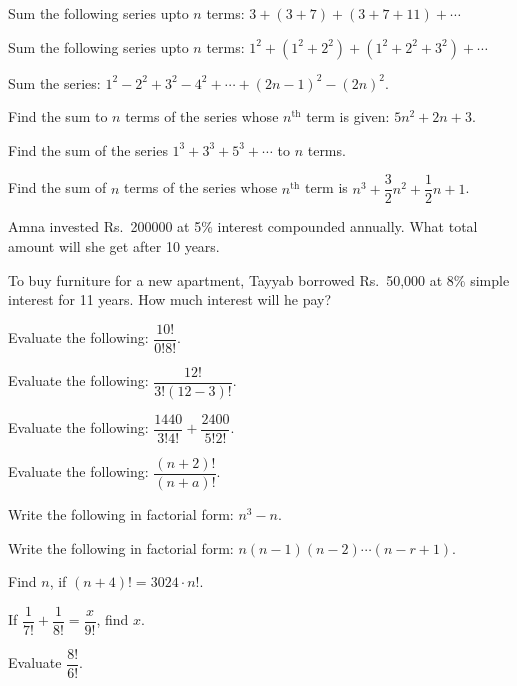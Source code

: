 \documentclass[11pt,a4paper]{article}
\begin{document}
\begin{shortlist}
\item Sum the following series upto $n$ terms: $3+(3+7)+(3+7+11)+\cdots$

\item Sum the following series upto $n$ terms: $1^2+(1^2+2^2)+(1^2+2^2+3^2)+\cdots$

\item Sum the series: $1^2-2^2+3^2-4^2+\cdots+(2n-1)^2-(2n)^2$.

\item Find the sum to $n$ terms of the series whose $n^{\text{th}}$ term is given: $5n^2+2n+3$.

\item Find the sum of the series $1^3+3^3+5^3+\cdots$ to $n$ terms.

\item Find the sum of $n$ terms of the series whose $n^{\text{th}}$ term is $n^3+\dfrac{3}{2}n^2+\dfrac{1}{2}n+1$.

\item Amna invested Rs.\ 200000 at 5\% interest compounded annually. What total amount will she get after 10 years.

\item To buy furniture for a new apartment, Tayyab borrowed Rs.\ 50{,}000 at 8\% simple interest for 11 years. How much interest will he pay?

\item Evaluate the following: $\dfrac{10!}{0!8!}$.

\item Evaluate the following: $\dfrac{12!}{3!(12-3)!}$.

\item Evaluate the following: $\dfrac{1440}{3!4!}+\dfrac{2400}{5!2!}$.

\item Evaluate the following: $\dfrac{(n+2)!}{(n+a)!}$.

\item Write the following in factorial form: $n^3-n$.

\item Write the following in factorial form: $n(n-1)(n-2)\cdots(n-r+1)$.

\item Find $n$, if $(n+4)!=3024\cdot n!$.

\item If $\dfrac{1}{7!}+\dfrac{1}{8!}=\dfrac{x}{9!}$, find $x$.

\item Evaluate $\dfrac{8!}{6!}$.


\end{shortlist}
\end{document}
